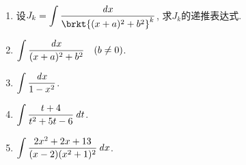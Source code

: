 \documentclass[a4paper,punct=CCT]{ctexbook}
\theoremstyle{definition}
\theoremstyle{remark}
\newif\ifshowsol
\begin{document}
\begin{enumerate}
  \ifshowsol
  \setlength{\itemsep}{10pt plus 4pt minus 4pt}
  \setlength{\abovedisplayskip}{5pt plus 2pt minus 5pt}
  \setlength{\belowdisplayskip}{10pt plus 3pt minus 2pt}
  \fi
\item 设\(\displaystyle J_k = \int \frac{\dx}{\brkt{(x+a)^2 + b^2}^k}\), 求\(J_k\)的递推表达式.

  \ifshowsol
  因为
  \[
    J_k
    = \int \frac{\dx}{\brkt{(x+a)^2 + b^2}^k}
    = \int \frac{\diff(x+a)}{\brkt{(x+a)^2 + b^2}^k}
    = \int \frac{\du}{\paren{u^2 + b^2}^k}
    = I_{k,b^2}(u)
    = I_{k,b^2}(x+a),
  \]
  所以
  \begin{equation*}
    \begin{split}
      J_{k+1}
      = I_{k+1,b^2}(x+a)
      &= \frac{1}{2kb^2} \brce[\bigg]{(2k-1) I_{k,b^2}(x+a) + \frac{x+a}{\brkt{(x+a)^2 + b^2}^k}} \\
      &= \frac{1}{2kb^2} \brce[\bigg]{(2k-1) J_k + \frac{x+a}{\brkt{(x+a)^2 + b^2}^k}}.
    \end{split}
  \end{equation*}
  \fi

\item \(\displaystyle \int \frac{\mathop{}\!\mathit{d} x}{(x+a)^2 + b^2} \quad (b \ne 0)\).

  \ifshowsol
  \[
    \int \frac{\dx}{(x+a)^2 + b^2}
    = \int \frac{\diff(x+a)}{(x+a)^2 + b^2}
    = \int \frac{\du}{u^2 + b^2}
    = \frac1b \arctan \frac ub + C
    = \frac1b \arctan \frac{x+a}b + C.
  \]
  \fi

\item \(\displaystyle \int \frac{\mathop{}\!\mathit{d} x}{1-x^2}\).

  \ifshowsol
  \[
    \int \frac{\dx}{1-x^2}
    = \arctanh x + C
    = \frac12 \ln\frac{1+x}{1-x} + C.
  \]
  \fi

\item \(\displaystyle \int \frac{t+4}{t^2 + 5t -6} \mathop{}\!\mathit{d} t\).

  \ifshowsol
  \[
    \begin{split}
      \int \frac{t+4}{t^2 + 5t -6} \dt
      &= \int \frac{t+4}{(t-1)(t+6)} \dt
      = \frac57 \int \frac{\dt}{t-1} + \frac27 \int \frac{\dt}{t+6} \\
      &= \frac57 \ln\abs[\big]{t-1} + \frac27 \ln\abs[\big]{t+6} + C
      = \frac17 \ln\abs[\big]{(t-1)^5 (t+6)^2} + C.
    \end{split}
  \]
  \fi

\item \(\displaystyle \int \frac{2x^2+2x+13}{(x-2)(x^2+1)^2} \mathop{}\!\mathit{d} x\).


\end{enumerate}
\end{document}

